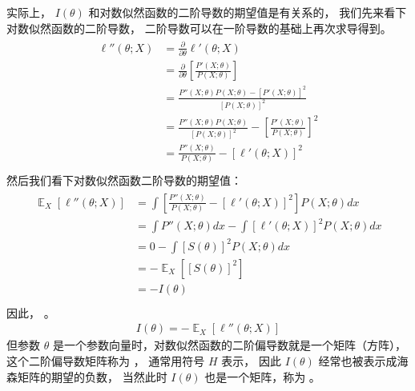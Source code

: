 \documentclass[letterpaper,10pt,english]{sphinxmanual}
\begin{document}
实际上， \(I(\theta)\) 和对数似然函数的二阶导数的期望值是有关系的，
我们先来看下对数似然函数的二阶导数，
二阶导数可以在一阶导数的基础上再次求导得到。
\begin{align}\label{equation:推断与检验/content:推断与检验/content:58}\!\begin{aligned}
\ell''(\theta;X) &= \frac{\partial}{\partial \theta} \ell'(\theta;X)\\
&= \frac{\partial}{\partial \theta} \left [  \frac{P'(X;\theta)}{P(X;\theta)} \right ]\\
&= \frac{P''(X;\theta)P(X;\theta)-[P'(X;\theta)]^2}{[P(X;\theta)]^2}\\
&= \frac{P''(X;\theta)P(X;\theta)}{[P(X;\theta)]^2} - \left[ \frac{P'(X;\theta)}{P(X;\theta)} \right]^2\\
&= \frac{P''(X;\theta)}{P(X;\theta)} - [\ell'(\theta;X)]^2\\
\end{aligned}\end{align}
然后我们看下对数似然函数二阶导数的期望值：
\begin{align}\label{equation:推断与检验/content:推断与检验/content:59}\!\begin{aligned}
\mathop{\mathbb{E}}_{X} \left[ \ell''(\theta;X) \right] &=
\int \left [  \frac{P''(X;\theta)}{P(X;\theta)} - [\ell'(\theta;X)]^2  \right ]  P(X;\theta) dx\\
&= \int P''(X;\theta) dx -\int [\ell'(\theta;X)]^2  P(X;\theta) dx\\
&= 0 - \int [S(\theta)]^2  P(X;\theta)  dx\\
&=  - \mathop{\mathbb{E}}_{X} [ [S(\theta)]^2 ]\\
&=  - I(\theta)\\
\end{aligned}\end{align}
因此， 。
\begin{equation}\label{equation:推断与检验/content:推断与检验/content:60}
\begin{split}I(\theta) = - \mathop{\mathbb{E}}_{X} \left[ \ell''(\theta;X) \right]\end{split}
\end{equation}
但参数 \(\theta\) 是一个参数向量时，对数似然函数的二阶偏导数就是一个矩阵（方阵），
这个二阶偏导数矩阵称为 ，
通常用符号 \(H\) 表示，
因此 \(I(\theta)\) 经常也被表示成海森矩阵的期望的负数，
当然此时 \(I(\theta)\) 也是一个矩阵，称为  。
\end{document}
